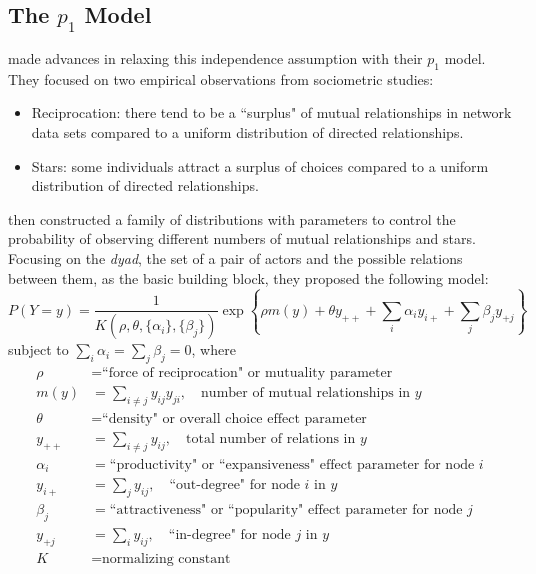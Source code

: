 \subsection{The $p_1$ Model} \label{S:p1}
\citet{Holland:1981} made advances in relaxing this independence assumption  with 
their $p_1$ model.  They focused on two empirical observations from sociometric 
studies:
\begin{itemize}
\item Reciprocation: there tend to be a ``surplus" of mutual relationships in network 
data sets compared to a uniform distribution of directed relationships.
\item Stars: some individuals attract a surplus of choices compared to a uniform 
distribution of directed relationships.
\end{itemize}
\citeauthor{Holland:1981} then constructed a family of distributions with parameters 
to control the probability of observing different numbers of mutual relationships and 
stars.  
Focusing on the \textit{dyad}, the set of a pair of actors and the possible relations 
between them, as the basic building block, they proposed the following model:
\[
	P( Y = y ) = \frac{1}{ K( \rho, \theta, \{ \alpha_i \}, \{\beta_j \} )}\exp \left 
\{  \rho m(y) + \theta y_{++} + \sum_i \alpha_i y_{i+} +  \sum_j \beta_j y_{+j}\right 
\}
\]
subject to $\sum_i \alpha_i = \sum_j \beta_j = 0$, where
\begin{align*}
	\rho &= \text{``force of reciprocation" or mutuality parameter}\\
	m(y) &= \sum_{i \neq j} y_{ij}y_{ji}, \quad \text{number of mutual relationships 
in $y$}\\
	\theta &= \text{``density" or overall choice effect parameter}\\
	y_{++} &= \sum_{i \neq j} y_{ij}, \quad  \text{total number of relations in $y$}\\
	\alpha_i &= \text{``productivity" or ``expansiveness" effect parameter for node $i
$}\\
	y_{i+} &= \sum_{j} y_{ij}, \quad  \text{``out-degree" for node $i$ in $y$}\\
	\beta_j &= \text{``attractiveness" or ``popularity" effect parameter for node $j$} 
\\
	y_{+j} &= \sum_{i} y_{ij}, \quad  \text{``in-degree" for node $j$ in $y$}\\
	K &= \text{normalizing constant}
\end{align*}


